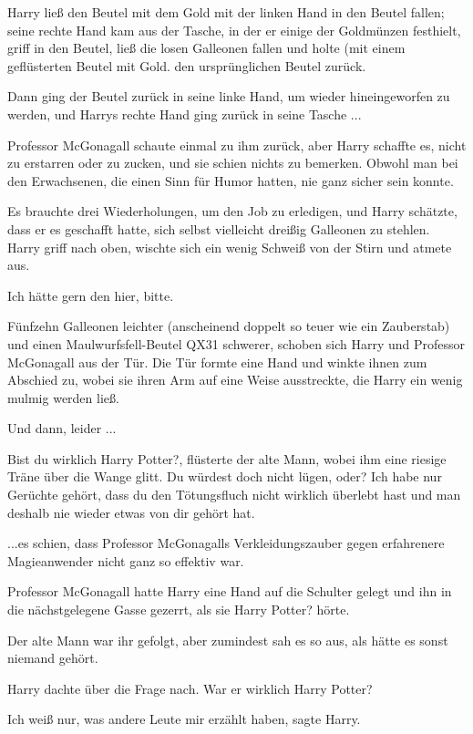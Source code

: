 Harry ließ den Beutel mit dem Gold mit der linken Hand in den Beutel fallen;
seine rechte Hand kam aus der Tasche, in der er einige der Goldmünzen festhielt,
griff in den Beutel, ließ die losen Galleonen fallen und holte (mit einem
geflüsterten \glqq{}Beutel mit Gold\grqq{}. den ursprünglichen Beutel zurück.

Dann ging der Beutel zurück in seine linke Hand, um wieder hineingeworfen zu
werden, und Harrys rechte Hand ging zurück in seine Tasche ...

Professor McGonagall schaute einmal zu ihm zurück, aber Harry schaffte es, nicht
zu erstarren oder zu zucken, und sie schien nichts zu bemerken. Obwohl man bei
den Erwachsenen, die einen Sinn für Humor hatten, nie ganz sicher sein konnte.

Es brauchte drei Wiederholungen, um den Job zu erledigen, und Harry schätzte,
dass er es geschafft hatte, sich selbst vielleicht dreißig Galleonen zu stehlen.
Harry griff nach oben, wischte sich ein wenig Schweiß von der Stirn und atmete
aus.

\glqq{}Ich hätte gern den hier, bitte.\grqq{}

Fünfzehn Galleonen leichter (anscheinend doppelt so teuer wie ein Zauberstab)
und einen Maulwurfsfell-Beutel QX31 schwerer, schoben sich Harry und Professor
McGonagall aus der Tür. Die Tür formte eine Hand und winkte ihnen zum Abschied
zu, wobei sie ihren Arm auf eine Weise ausstreckte, die Harry ein wenig mulmig
werden ließ.

Und dann, leider ...

\glqq{}Bist du wirklich Harry Potter?\grqq{}, flüsterte der alte Mann, wobei ihm
eine riesige Träne über die Wange glitt. \glqq{}Du würdest doch nicht lügen,
oder? Ich habe nur Gerüchte gehört, dass du den Tötungsfluch nicht wirklich
überlebt hast und man deshalb nie wieder etwas von dir gehört hat.\grqq{}

...es schien, dass Professor McGonagalls Verkleidungszauber gegen erfahrenere
Magieanwender nicht ganz so effektiv war.

Professor McGonagall hatte Harry eine Hand auf die Schulter gelegt und ihn in
die nächstgelegene Gasse gezerrt, als sie \glqq{}Harry Potter?\grqq{} hörte.

Der alte Mann war ihr gefolgt, aber zumindest sah es so aus, als hätte es sonst
niemand gehört.

Harry dachte über die Frage nach. War er wirklich Harry Potter?

\glqq{}Ich weiß nur, was andere Leute mir erzählt haben\grqq{}, sagte Harry.

